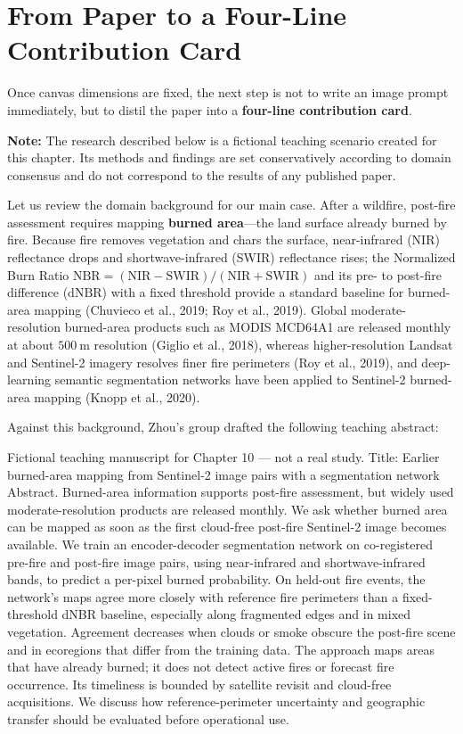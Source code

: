 \section{From Paper to a Four-Line Contribution Card}

Once canvas dimensions are fixed, the next step is not to write an image prompt immediately, but to distil the paper into a \textbf{four-line contribution card}.

\begin{BookNote}
\textbf{Note:} The research described below is a fictional teaching scenario created for this chapter. Its methods and findings are set conservatively according to domain consensus and do not correspond to the results of any published paper.
\end{BookNote}

Let us review the domain background for our main case. After a wildfire, post-fire assessment requires mapping \textbf{burned area}---the land surface already burned by fire. Because fire removes vegetation and chars the surface, near-infrared (NIR) reflectance drops and shortwave-infrared (SWIR) reflectance rises; the Normalized Burn Ratio $\text{NBR} = (\text{NIR} - \text{SWIR})/(\text{NIR} + \text{SWIR})$ and its pre- to post-fire difference ($\text{dNBR}$) with a fixed threshold provide a standard baseline for burned-area mapping (Chuvieco et al., 2019; Roy et al., 2019). Global moderate-resolution burned-area products such as MODIS MCD64A1 are released monthly at about $500\ \text{m}$ resolution (Giglio et al., 2018), whereas higher-resolution Landsat and Sentinel-2 imagery resolves finer fire perimeters (Roy et al., 2019), and deep-learning semantic segmentation networks have been applied to Sentinel-2 burned-area mapping (Knopp et al., 2020).

Against this background, Zhou's group drafted the following teaching abstract:

\begin{Prompt}
Fictional teaching manuscript for Chapter 10 — not a real study.
Title: Earlier burned-area mapping from Sentinel-2 image pairs with a
segmentation network
Abstract. Burned-area information supports post-fire assessment, but widely
used moderate-resolution products are released monthly. We ask whether burned
area can be mapped as soon as the first cloud-free post-fire Sentinel-2 image
becomes available. We train an encoder-decoder segmentation network on
co-registered pre-fire and post-fire image pairs, using near-infrared and
shortwave-infrared bands, to predict a per-pixel burned probability. On
held-out fire events, the network's maps agree more closely with reference fire
perimeters than a fixed-threshold dNBR baseline, especially along fragmented
edges and in mixed vegetation. Agreement decreases when clouds or smoke obscure
the post-fire scene and in ecoregions that differ from the training data. The
approach maps areas that have already burned; it does not detect active fires
or forecast fire occurrence. Its timeliness is bounded by satellite revisit and
cloud-free acquisitions. We discuss how reference-perimeter uncertainty and
geographic transfer should be evaluated before operational use.
\end{Prompt}

